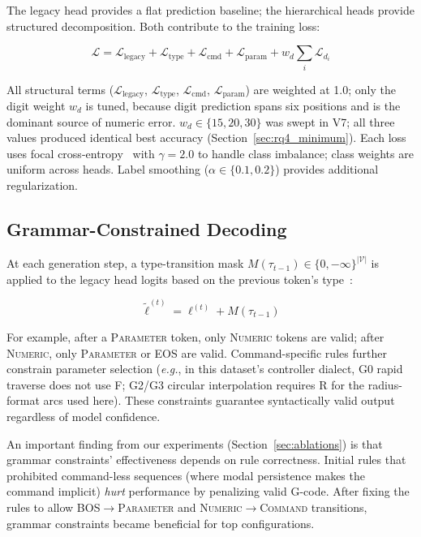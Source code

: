 \documentclass[sensors,article,submit,moreauthors,pdftex]{Definitions/mdpi}
\newcommand{\eg}{\textit{e.g.}}
\begin{document}
The legacy head provides a flat prediction baseline; the hierarchical heads provide structured decomposition. Both contribute to the training loss:

\begin{equation}
\mathcal{L} = \mathcal{L}_\text{legacy} + \mathcal{L}_\text{type} + \mathcal{L}_\text{cmd} + \mathcal{L}_\text{param} + w_d \sum_{i} \mathcal{L}_{d_i}
\label{eq:loss}
\end{equation}

\noindent All structural terms ($\mathcal{L}_\text{legacy}$, $\mathcal{L}_\text{type}$, $\mathcal{L}_\text{cmd}$, $\mathcal{L}_\text{param}$) are weighted at 1.0; only the digit weight $w_d$ is tuned, because digit prediction spans six positions and is the dominant source of numeric error. $w_d \in \{15, 20, 30\}$ was swept in V7; all three values produced identical best accuracy (Section~\ref{sec:rq4_minimum}). Each loss uses focal cross-entropy~\cite{focal_loss} with $\gamma = 2.0$ to handle class imbalance; class weights are uniform across heads. Label smoothing ($\alpha \in \{0.1, 0.2\}$) provides additional regularization.

\subsection{Grammar-Constrained Decoding}

At each generation step, a type-transition mask $M(\tau_{t-1}) \in \{0, -\infty\}^{|\mathcal{V}|}$ is applied to the legacy head logits based on the previous token's type~\cite{grammar_paper}:

\begin{equation}
    \tilde{\ell}^{(t)} = \ell^{(t)} + M(\tau_{t-1})
\end{equation}

For example, after a \textsc{Parameter} token, only \textsc{Numeric} tokens are valid; after \textsc{Numeric}, only \textsc{Parameter} or \textsc{EOS} are valid. Command-specific rules further constrain parameter selection (\eg, in this dataset's controller dialect, G0 rapid traverse does not use F; G2/G3 circular interpolation requires R for the radius-format arcs used here). These constraints guarantee syntactically valid output regardless of model confidence.

An important finding from our experiments (Section~\ref{sec:ablations}) is that grammar constraints' effectiveness depends on rule correctness. Initial rules that prohibited command-less sequences (where modal persistence makes the command implicit) \emph{hurt} performance by penalizing valid G-code. After fixing the rules to allow \textsc{BOS}$\to$\textsc{Parameter} and \textsc{Numeric}$\to$\textsc{Command} transitions, grammar constraints became beneficial for top configurations.
\end{document}
